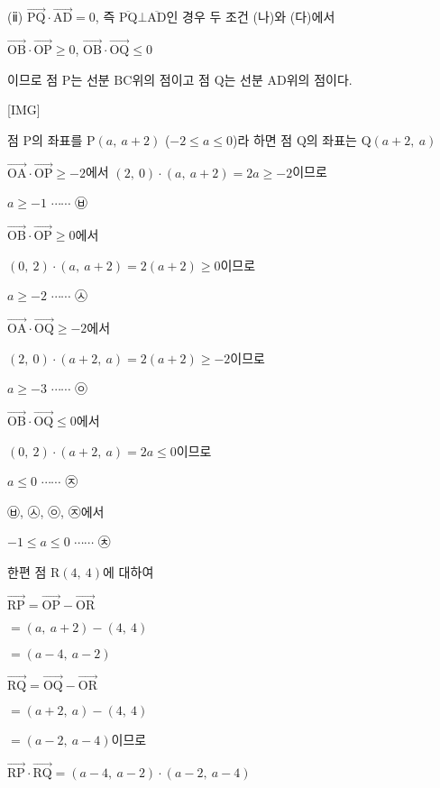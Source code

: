 \documentclass{oblivoir}
\begin{document}
(ⅱ) $\overrightarrow{\mathrm{PQ}}\cdot\overrightarrow{\mathrm{AD}} = 0$, 즉 $\overline{\mathrm{PQ}}\bot\overline{\mathrm{AD}}$인 경우 두 조건 (나)와 (다)에서 

$\overrightarrow{\mathrm{OB}}\cdot\overrightarrow{\mathrm{OP}}\ge 0$, $\overrightarrow{\mathrm{OB}}\cdot\overrightarrow{\mathrm{OQ}}\le 0$

이므로 점 $\mathrm{P}$는 선분 $\mathrm{BC}$위의 점이고 점 $\mathrm{Q}$는 선분 $\mathrm{AD}$위의 점이다.

[IMG]

점 $\mathrm{P}$의 좌표를 $\mathrm{P}(a ,\:  a+2)$ ($-2\le a\le 0$)라 하면 점 $\mathrm{Q}$의 좌표는 $\mathrm{Q}(a+2 ,\:  a)$

$\overrightarrow{\mathrm{OA}}\cdot\overrightarrow{\mathrm{OP}}\ge -2$에서 $(2,\:0)\cdot(a,\:a+2)=2a\ge -2$이므로

$a\ge -1$ $\cdots\cdots$ ㉥

$\overrightarrow{\mathrm{OB}}\cdot\overrightarrow{\mathrm{OP}}\ge 0$에서 

$(0,\:2)\cdot(a,\: a+2)= 2(a+2)\ge 0$이므로 

$a\ge -2$ $\cdots\cdots$ ㉦

$\overrightarrow{\mathrm{OA}}\cdot\overrightarrow{\mathrm{OQ}}\ge -2$에서

$(2,\:  0)\cdot(a+2 ,\:  a)= 2(a+ 2)\ge - 2$이므로 

$a\ge -3$ $\cdots\cdots$ ㉧

$\overrightarrow{\mathrm{OB}}\cdot\overrightarrow{\mathrm{OQ}}\le 0$에서 

$(0,\:2)\cdot(a+2,\:  a)= 2a\le 0$이므로

$a\le 0$ $\cdots\cdots$ ㉨

㉥, ㉦, ㉧, ㉨에서 

$-1\le a\le 0$ $\cdots\cdots$ ㉩

한편 점 $\mathrm{R}(4,\: 4)$에 대하여

$\overrightarrow{\mathrm{RP}}$$=\overrightarrow{\mathrm{OP}} -\overrightarrow{\mathrm{OR}}$

$=(a,\:  a+2)-(4,\:  4)$

$=(a-4 ,\:  a -2)$

$\overrightarrow{\mathrm{RQ}}$$=\overrightarrow{\mathrm{OQ}} -\overrightarrow{\mathrm{OR}}$

$=(a+2 ,\:  a)-(4,\:  4)$

$=(a-2 ,\:  a -4)$이므로

$\overrightarrow{\mathrm{RP}}\cdot\overrightarrow{\mathrm{RQ}}$$=(a-4 ,\:  a -2)\cdot(a-2,\:  a-4)$
\end{document}

